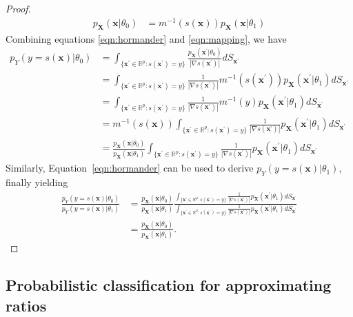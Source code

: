 \documentclass[12pt]{article}
\numberwithin{equation}{section}
\theoremstyle{plain}
\begin{document}
\begin{proof}
\begin{align}
p_\mathbf{X}(\mathbf{x}|\theta_0) &= m^{-1}(s(\mathbf{x})) p_\mathbf{X}(\mathbf{x}|\theta_1) \label{eqn:mapping}
\end{align}
Combining equations \ref{eqn:hormander} and \ref{eqn:mapping}, we have
\begin{align}
p_Y(y=s(\mathbf{x})|\theta_0) &= \int_{\{\mathbf{x}^\prime \in \mathbb{R}^p : s(\mathbf{x}^\prime) = y\}} \frac{p_\mathbf{X}(\mathbf{x}^\prime|\theta_0)}{|\nabla s(\mathbf{x}^\prime)|} dS_{\mathbf{x}^\prime} \nonumber \\
&= \int_{\{\mathbf{x}^\prime \in \mathbb{R}^p : s(\mathbf{x}^\prime) = y\}}  \frac{1}{|\nabla s(\mathbf{x}^\prime)|} m^{-1}(s(\mathbf{x}^\prime)) p_\mathbf{X}(\mathbf{x}^\prime|\theta_1) dS_{\mathbf{x}^\prime} \nonumber \\
&= \int_{\{\mathbf{x}^\prime \in \mathbb{R}^p : s(\mathbf{x}^\prime) = y\}}  \frac{1}{|\nabla s(\mathbf{x}^\prime)|} m^{-1}(y) p_\mathbf{X}(\mathbf{x}^\prime|\theta_1) dS_{\mathbf{x}^\prime} \nonumber \\
&= m^{-1}(s(\mathbf{x})) \int_{\{\mathbf{x}^\prime \in \mathbb{R}^p : s(\mathbf{x}^\prime) = y\}}  \frac{1}{|\nabla s(\mathbf{x}^\prime)|}  p_\mathbf{X}(\mathbf{x}^\prime|\theta_1) dS_{\mathbf{x}^\prime} \nonumber \\
&= \frac{p_\mathbf{X}(\mathbf{x}|\theta_0)}{p_\mathbf{X}(\mathbf{x}|\theta_1)} \int_{\{\mathbf{x}^\prime \in \mathbb{R}^p : s(\mathbf{x}^\prime) = y\}}  \frac{1}{|\nabla s(\mathbf{x}^\prime)|}  p_\mathbf{X}(\mathbf{x}^\prime|\theta_1) dS_{\mathbf{x}^\prime}
\end{align}
Similarly, Equation~\ref{eqn:hormander} can be used to derive $p_Y(y=s(\mathbf{x})|\theta_1)$, finally yielding
\begin{align}
\frac{p_Y(y=s(\mathbf{x})|\theta_0)}{p_Y(y=s(\mathbf{x})|\theta_1)} &= \frac{p_\mathbf{X}(\mathbf{x}|\theta_0)}{p_\mathbf{X}(\mathbf{x}|\theta_1)} \frac{\int_{\{\mathbf{x}^\prime \in \mathbb{R}^p : s(\mathbf{x}^\prime) = y\}}  \frac{1}{|\nabla s(\mathbf{x}^\prime)|}  p_\mathbf{X}(\mathbf{x}^\prime|\theta_1) dS_{\mathbf{x}^\prime}}{ \int_{\{\mathbf{x}^\prime \in \mathbb{R}^p : s(\mathbf{x}^\prime) = y\}}  \frac{1}{|\nabla s(\mathbf{x}^\prime)|}  p_\mathbf{X}(\mathbf{x}^\prime|\theta_1) dS_{\mathbf{x}^\prime} } \nonumber \\
&= \frac{p_\mathbf{X}(\mathbf{x}|\theta_0)}{p_\mathbf{X}(\mathbf{x}|\theta_1)}.
\end{align}
\end{proof}

\subsection{Probabilistic classification for approximating ratios}
\end{document}
